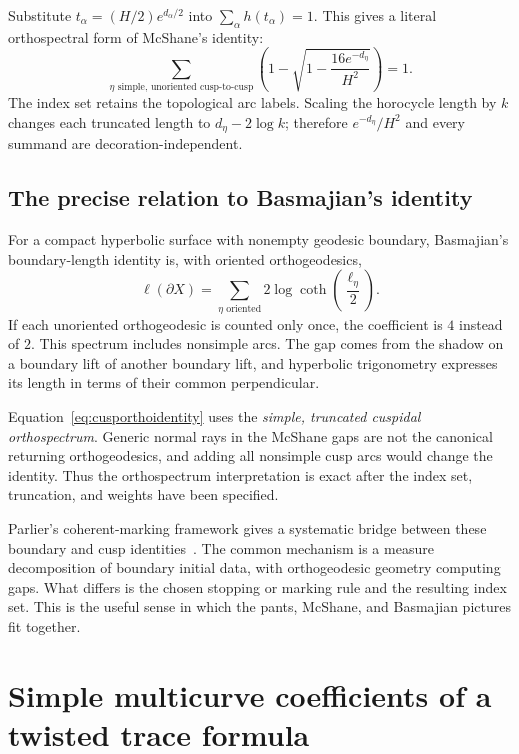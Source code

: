 \documentclass[11pt,a4paper]{article}
\numberwithin{equation}{section}
\theoremstyle{definition}
\theoremstyle{remark}
\begin{document}
Substitute $t_\alpha=(H/2)e^{d_\alpha/2}$ into
$\sum_\alpha h(t_\alpha)=1$. This gives a literal orthospectral form of
McShane's identity:
\begin{equation}
 \boxed{
 \sum_{\eta\text{ simple, unoriented cusp-to-cusp}}
 \left(1-\sqrt{1-\frac{16e^{-d_\eta}}{H^2}}\right)=1.}
 \label{eq:cusporthoidentity}
\end{equation}
The index set retains the topological arc labels. Scaling the horocycle
length by $k$ changes each truncated length to $d_\eta-2\log k$;
therefore $e^{-d_\eta}/H^2$ and every summand are decoration-independent.

\subsection{The precise relation to Basmajian's identity}

For a compact hyperbolic surface with nonempty geodesic boundary,
Basmajian's boundary-length identity is, with oriented orthogeodesics,
\begin{equation}
 \ell(\partial X)=
 \sum_{\eta\text{ oriented}}2\log\coth\left(\frac{\ell_\eta}{2}\right).
 \label{eq:basmajian}
\end{equation}
If each unoriented orthogeodesic is counted only once, the coefficient is
$4$ instead of $2$. This spectrum includes nonsimple arcs. The gap comes
from the shadow on a boundary lift of another boundary lift, and
hyperbolic trigonometry expresses its length in terms of their common
perpendicular.

Equation~\eqref{eq:cusporthoidentity} uses the \emph{simple, truncated
cuspidal orthospectrum}. Generic normal rays in the McShane gaps are not
the canonical returning orthogeodesics, and adding all nonsimple cusp arcs
would change the identity. Thus the orthospectrum interpretation is exact
after the index set, truncation, and weights have been specified.

Parlier's coherent-marking framework gives a systematic bridge between
these boundary and cusp identities~\cite{Parlier}. The common mechanism
is a measure decomposition of boundary initial data, with orthogeodesic
geometry computing gaps. What differs is the chosen stopping or marking
rule and the resulting index set. This is the useful sense in which the
pants, McShane, and Basmajian pictures fit together.

\clearpage
\section{Simple multicurve coefficients of a twisted trace formula}
\label{sec:coefficientdistributions}
\end{document}
